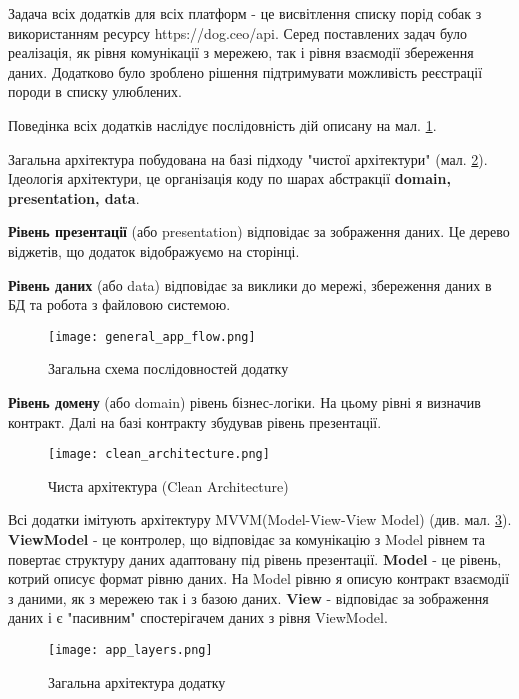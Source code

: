 Задача всіх додатків для всіх платформ - це висвітлення списку порід собак з використанням ресурсу https://dog.ceo/api.
Серед поставлених задач було реалізація, як рівня комунікації з мережею, так і рівня взаємодії збереження
даних. Додатково було зроблено рішення підтримувати можливість реєстрації породи в списку улюблених.

Поведінка всіх додатків наслідує послідовність дій описану на мал. \ref{fig:gen_app_flow}.

Загальна архітектура побудована на базі підходу "чистої архітектури" (мал. \ref{fig:clean_architecture}).
Ідеологія архітектури, це організація коду по шарах абстракції \textbf{domain, presentation, data}.

\textbf{Рівень презентації} (або presentation) відповідає за зображення даних. Це дерево віджетів,
що додаток відображуємо на сторінці.

\textbf{Рівень даних} (або data) відповідає за виклики до мережі, збереження даних в БД та робота з файловою системою.

\FloatBarrier

\begin{figure}[ht]
    \texttt{[image: general\_app\_flow.png]}
    \caption{Загальна схема послідовностей додатку}
    \label{fig:gen_app_flow}
\end{figure}

\textbf{Рівень домену} (або domain) рівень бізнес-логіки. На цьому рівні я визначив контракт. Далі на базі контракту
збудував рівень презентації.

\begin{figure}[h]
    \begin{center}
        \texttt{[image: clean\_architecture.png]}
    \end{center}
    \caption{Чиста архітектура (Clean Architecture)}
    \label{fig:clean_architecture}
\end{figure}

Всі додатки імітують архітектуру MVVM(Model-View-View Model) (див. мал. \ref{fig:gen_app_architecture}).
\textbf{ViewModel} - це контролер, що відповідає за комунікацію з Model рівнем та повертає структуру даних адаптовану під рівень презентації.
\textbf{Model} - це рівень, котрий описує формат рівню даних. На Model рівню я описую контракт взаємодії з даними, як з
мережею так і з базою даних.
\textbf{View} - відповідає за зображення даних і є "пасивним" спостерігачем даних з рівня ViewModel.

\FloatBarrier
\begin{figure}[h]
    \begin{center}
        \texttt{[image: app\_layers.png]}
    \end{center}
    \caption{Загальна архітектура додатку}
    \label{fig:gen_app_architecture}
\end{figure}
\FloatBarrier


